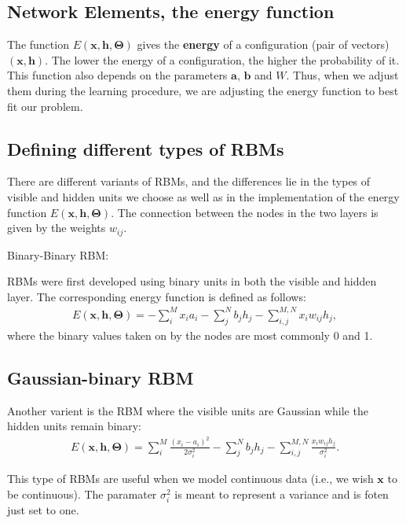 \documentclass[%
oneside,                 %
final,                   %
10pt]{article}
\begin{document}
\subsection{Network Elements, the energy function}

The function $E(\bm{x},\bm{h},\bm{\Theta})$ gives the \textbf{energy} of a
configuration (pair of vectors) $(\bm{x}, \bm{h})$. The lower
the energy of a configuration, the higher the probability of it. This
function also depends on the parameters $\bm{a}$, $\bm{b}$ and
$W$. Thus, when we adjust them during the learning procedure, we are
adjusting the energy function to best fit our problem.

\subsection{Defining different types of RBMs}

There are different variants of RBMs, and the differences lie in the types of visible and hidden units we choose as well as in the implementation of the energy function $E(\bm{x},\bm{h},\bm{\Theta})$. The connection between the nodes in the two layers is given by the weights $w_{ij}$. 

\begin{block}{Binary-Binary RBM: }

RBMs were first developed using binary units in both the visible and hidden layer. The corresponding energy function is defined as follows:
\begin{align*}
	E(\bm{x}, \bm{h},\bm{\Theta}) = - \sum_i^M x_i a_i- \sum_j^N b_j h_j - \sum_{i,j}^{M,N} x_i w_{ij} h_j,
\end{align*}
where the binary values taken on by the nodes are most commonly 0 and 1.
\end{block}

\subsection{Gaussian-binary RBM}

Another varient is the RBM where the visible units are Gaussian while the hidden units remain binary:
\begin{align*}
	E(\bm{x}, \bm{h},\bm{\Theta}) = \sum_i^M \frac{(x_i - a_i)^2}{2\sigma_i^2} - \sum_j^N b_j h_j - \sum_{i,j}^{M,N} \frac{x_i w_{ij} h_j}{\sigma_i^2}. 
\end{align*}

This type of RBMs are useful when we model continuous data (i.e., we wish $\bm{x}$ to be continuous). The paramater $\sigma_i^2$ is meant to represent a variance and is foten just set to one.
\end{document}
